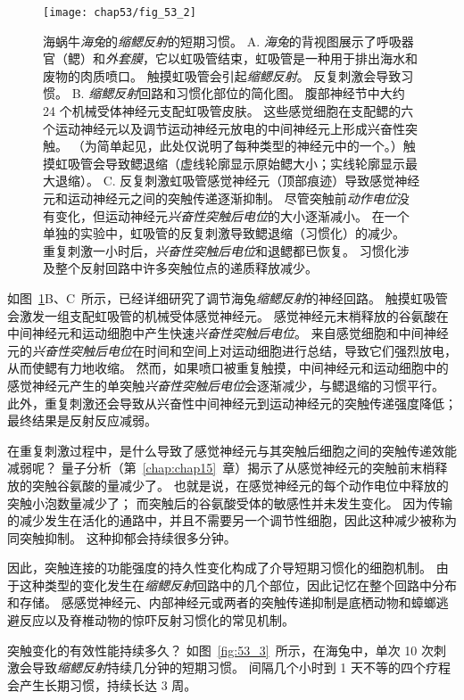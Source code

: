 \begin{figure}[htbp]
	\centering
	\texttt{[image: chap53/fig\_53\_2]}
	\caption{海蜗牛\textit{海兔}的\textit{缩鳃反射}的短期习惯。
		A. \textit{海兔}的背视图展示了呼吸器官（鳃）和\textit{外套膜}，它以虹吸管结束，虹吸管是一种用于排出海水和废物的肉质喷口。
		触摸虹吸管会引起\textit{缩鳃反射}。
		反复刺激会导致习惯。
		B. \textit{缩鳃反射}回路和习惯化部位的简化图。
		腹部神经节中大约 24 个机械受体神经元支配虹吸管皮肤。
		这些感觉细胞在支配鳃的六个运动神经元以及调节运动神经元放电的中间神经元上形成兴奋性突触。
		（为简单起见，此处仅说明了每种类型的神经元中的一个。）触摸虹吸管会导致鳃退缩（虚线轮廓显示原始鳃大小；实线轮廓显示最大退缩）。
		C. 反复刺激虹吸管感觉神经元（顶部痕迹）导致感觉神经元和运动神经元之间的突触传递逐渐抑制。
		尽管突触前\textit{动作电位}没有变化，但运动神经元\textit{兴奋性突触后电位}的大小逐渐减小。
		在一个单独的实验中，虹吸管的反复刺激导致鳃退缩（习惯化）的减少。
		重复刺激一小时后，\textit{兴奋性突触后电位}和退鳃都已恢复。
		习惯化涉及整个反射回路中许多突触位点的递质释放减少\cite{pinsker1970habituation}。}
	\label{fig:53_2}
\end{figure}


如图~\ref{fig:53_2}B、C~所示，已经详细研究了调节海兔\textit{缩鳃反射}的神经回路。
触摸虹吸管会激发一组支配虹吸管的机械受体感觉神经元。
感觉神经元末梢释放的谷氨酸在中间神经元和运动细胞中产生快速\textit{兴奋性突触后电位}。
来自感觉细胞和中间神经元的\textit{兴奋性突触后电位}在时间和空间上对运动细胞进行总结，导致它们强烈放电，从而使鳃有力地收缩。
然而，如果喷口被重复触摸，中间神经元和运动细胞中的感觉神经元产生的单突触\textit{兴奋性突触后电位}会逐渐减少，与鳃退缩的习惯平行。
此外，重复刺激还会导致从兴奋性中间神经元到运动神经元的突触传递强度降低；
最终结果是反射反应减弱。


在重复刺激过程中，是什么导致了感觉神经元与其突触后细胞之间的突触传递效能减弱呢？
量子分析（第~\ref{chap:chap15}~章）揭示了从感觉神经元的突触前末梢释放的突触谷氨酸的量减少了。
也就是说，在感觉神经元的每个动作电位中释放的突触小泡数量减少了；
而突触后的谷氨酸受体的敏感性并未发生变化。
因为传输的减少发生在活化的通路中，并且不需要另一个调节性细胞，因此这种减少被称为同突触抑制。
这种抑郁会持续很多分钟。


因此，突触连接的功能强度的持久性变化构成了介导短期习惯化的细胞机制。
由于这种类型的变化发生在\textit{缩鳃反射}回路中的几个部位，因此记忆在整个回路中分布和存储。
感感觉神经元、内部神经元或两者的突触传递抑制是底栖动物和蟑螂逃避反应以及脊椎动物的惊吓反射习惯化的常见机制。


突触变化的有效性能持续多久？
如图~\ref{fig:53_3}~所示，在海兔中，单次 10 次刺激会导致\textit{缩鳃反射}持续几分钟的短期习惯。
间隔几个小时到 1 天不等的四个疗程会产生长期习惯，持续长达 3 周。



